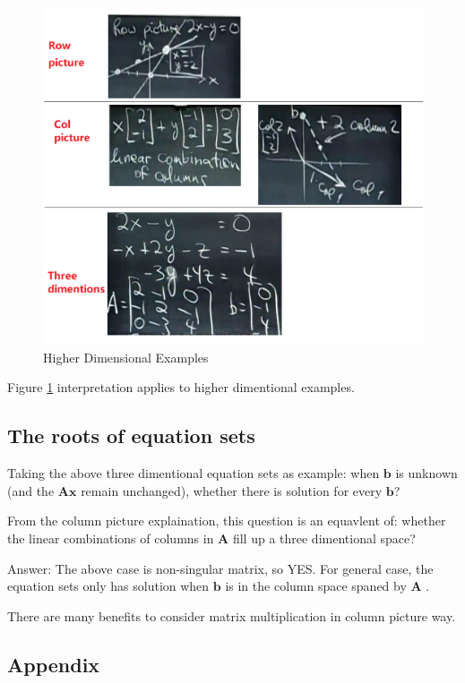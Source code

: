 \documentclass[a4paper,12pt]{article}
\begin{document}
\begin{figure}[!hbtp]
  \centering
  \includegraphics[width=0.75\linewidth]{figures/1.png}
  \caption{Higher Dimensional Examples}
  \label{fig:hd-examples}
\end{figure}

Figure \ref{fig:hd-examples} interpretation applies to higher dimentional examples.

\subsection{The roots of equation sets}

Taking the above three dimentional equation sets as example: when
$\boldsymbol{b}$ is unknown (and the $\boldsymbol{Ax}$ remain unchanged),
whether there is solution for every $\boldsymbol{b}$?

From the column picture explaination, this question is an equavlent of: whether
the linear combinations of columns in $\boldsymbol{A}$ fill up a three
dimentional space?

Answer:
The above case is non-singular matrix, so YES.
For general case, the equation sets {\color{red} only has solution when $\boldsymbol{b}$ is
in the column space spaned by $\boldsymbol{A}$ }.

There are many benefits to consider matrix multiplication in {\color{red} column
picture} way.

\subsection{Appendix}
\end{document}
